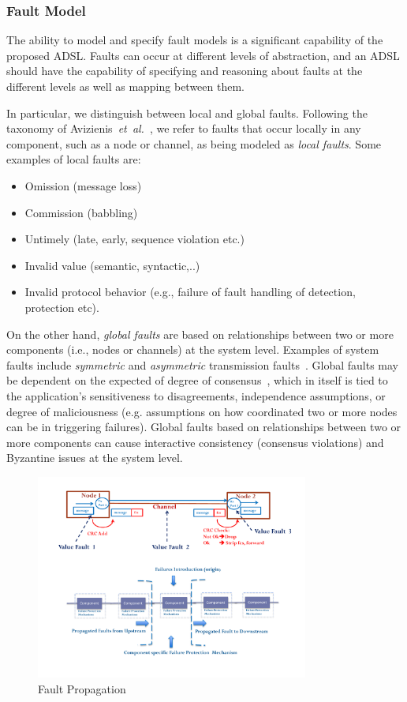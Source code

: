 \subsubsection{Fault Model}

The ability to model and specify fault models is a  significant capability
of the proposed ADSL. Faults can occur at different levels of abstraction, and an ADSL should have the capability of specifying and reasoning about faults at the different levels as well as mapping between them.

In particular, we distinguish between local and global faults.
Following the taxonomy of Avizienis~\emph{et~al.}~\cite{taxonomy},
we refer to faults that occur locally in any component, such as a node or channel, as being modeled as \emph{local faults}. Some examples of
local faults are:
\begin{itemize}
  \item Omission (message loss)
  \item Commission (babbling)
  \item Untimely (late, early, sequence violation etc.)
  \item Invalid value (semantic, syntactic,..)
  \item Invalid protocol behavior (e.g., failure of fault handling of detection,
protection etc).
\end{itemize}

On the other hand, \emph{global faults} are based on relationships between
two or more components (i.e., nodes or channels) at the system level. Examples of system
faults include \emph{symmetric} and \emph{asymmetric} transmission faults~\cite{Tha88:RDSS}. Global faults
may be dependent on the expected of degree of consensus~\cite{lynch}, which in itself is
tied to the application's sensitiveness to disagreements, independence assumptions, or degree of maliciousness (e.g. assumptions on how coordinated two or more nodes can be in triggering failures). Global faults based on relationships between two or more components can cause interactive consistency (consensus violations) and Byzantine issues at the system level.


\begin{figure}
\begin{center}
\includegraphics[width=0.8\textwidth]{figures/fault_propagation.pdf}
\caption{Fault Propagation}
\label{fig:fault_propagation}
\end{center}
\end{figure}

